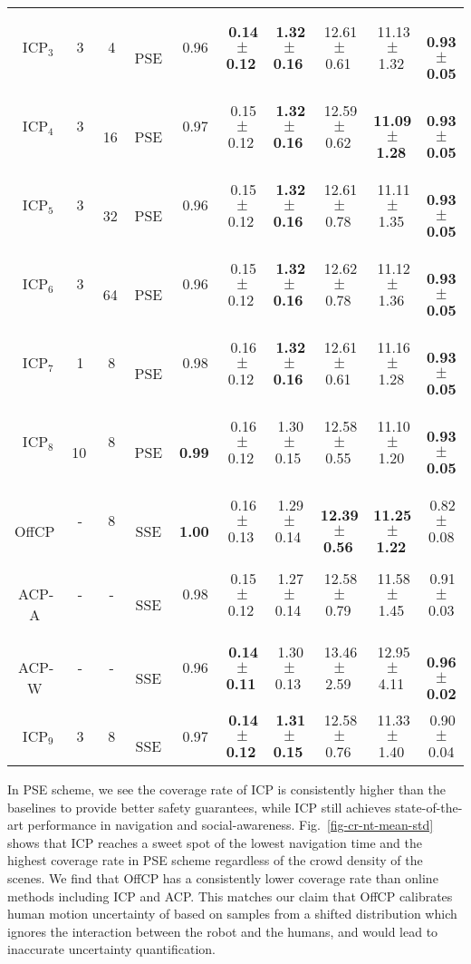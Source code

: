 \begin{table}[hbt!]
\begin{center}
\begin{tabular}{c|ccc|cccccc}
    \, ICP$_3$\, & \,3\, & \,4\, & \,PSE\, & \,0.96\, & \,\textbf{0.14$\pm$0.12}\, & \,\textbf{1.32$\pm$0.16}\, & \,12.61$\pm$0.61\, & \,11.13$\pm$1.32\, & \,\textbf{0.93$\pm$0.05} \\
    \, ICP$_4$\, & \,3\, & \,16\, & \,PSE\, & \,0.97\, & \,0.15$\pm$0.12\, & \,\textbf{1.32$\pm$0.16}\, & \,12.59$\pm$0.62\, & \,\textbf{11.09$\pm$1.28}\, & \,\textbf{0.93$\pm$0.05} \\
    \, ICP$_5$\, & \,3\, & \,32\, & \,PSE\, & \,0.96\, & \,0.15$\pm$0.12\, & \,\textbf{1.32$\pm$0.16}\, & \,12.61$\pm$0.78\, & \,11.11$\pm$1.35\, & \,\textbf{0.93$\pm$0.05} \\
    \, ICP$_6$\, & \,3\, & \,64\, & \,PSE\, & \,0.96\, & \,0.15$\pm$0.12\, & \,\textbf{1.32$\pm$0.16}\, & \,12.62$\pm$0.78\, & \,11.12$\pm$1.36\, & \,\textbf{0.93$\pm$0.05} \\
    \hline
    \, ICP$_7$\, & \,1\, & \,8\, & \,PSE\, & \,0.98\, & \,0.16$\pm$0.12\, & \,\textbf{1.32$\pm$0.16}\, & \,12.61$\pm$0.61\, & \,11.16$\pm$1.28\, & \,\textbf{0.93$\pm$0.05} \\
    \, ICP$_8$\, & \,10\, & \,8\, & \,PSE\, & \,\textbf{0.99}\, & \,0.16$\pm$0.12\, & \,1.30$\pm$0.15\, & \,12.58$\pm$0.55\, & \,11.10$\pm$1.20\, & \,\textbf{0.93$\pm$0.05} \\
    \hline
    \hline
    \, OffCP\, & \,-\, & \,8\, & \,SSE\, & \,\textbf{1.00}\, & \,0.16$\pm$0.13\, & \,1.29$\pm$0.14\, & \,\textbf{12.39$\pm$0.56}\, & \,\textbf{11.25$\pm$1.22}\, & \,0.82$\pm$0.08 \\
    \, ACP-A\, & \,-\, & \,-\, & \,SSE\, & \,0.98\, & \,0.15$\pm$0.12\, & \,1.27$\pm$0.14\, & \,12.58$\pm$0.79\, & \,11.58$\pm$1.45\, & \,0.91$\pm$0.03 \\
    \, ACP-W\, & \,-\, & \,-\, & \,SSE\, & \,0.96\, & \,\textbf{0.14$\pm$0.11}\, & \,1.30$\pm$0.13\, & \,13.46$\pm$2.59\, & \,12.95$\pm$4.11\, & \,\textbf{0.96$\pm$0.02} \\
    \, ICP$_9$\, & \,3\, & \,8\, & \,SSE\, & \,0.97\, & \,\textbf{0.14$\pm$0.12}\, & \,\textbf{1.31$\pm$0.15}\, & \,12.58$\pm$0.76\, & \,11.33$\pm$1.40\, & \,0.90$\pm$0.04 \\
    \hline
\end{tabular}
\end{center}
\end{table}

In PSE scheme, we see the coverage rate of ICP is consistently higher than the baselines to provide better safety guarantees, while ICP still achieves state-of-the-art performance in navigation and social-awareness. Fig.~\ref{fig-cr-nt-mean-std} shows that ICP reaches a sweet spot of the lowest navigation time and the highest coverage rate in PSE scheme regardless of the crowd density of the scenes. We find that OffCP has a consistently lower coverage rate than online methods including ICP and ACP. This matches our claim that OffCP calibrates human motion uncertainty of based on samples from a shifted distribution which ignores the interaction between the robot and the humans, and would lead to inaccurate uncertainty quantification.

